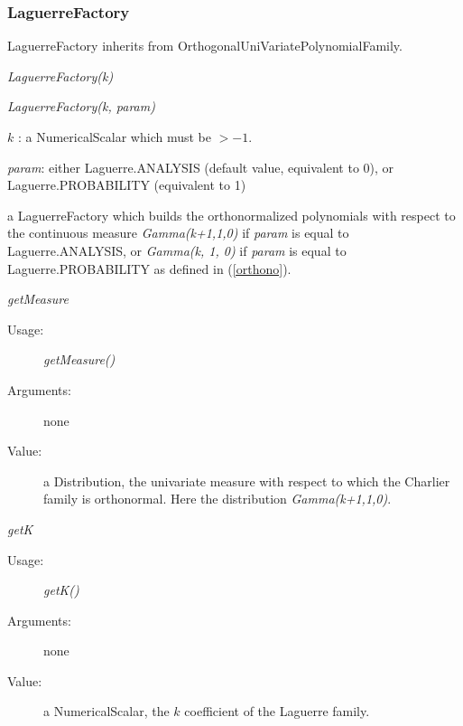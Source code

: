\newpage
\subsubsection{LaguerreFactory}

LaguerreFactory inherits from OrthogonalUniVariatePolynomialFamily.

\begin{description}
\item[Usage:]
\begin{description}
\item \textit{LaguerreFactory(k)}
\item \textit{LaguerreFactory(k, param)}
\end{description}

\item[Arguments:]
\begin{description}
\item $k$ : a NumericalScalar which must be $> -1$.
\item \textit{param}: either Laguerre.ANALYSIS (default value, equivalent to 0), or Laguerre.PROBABILITY (equivalent to 1)
\end{description}

\item[Value:]  a LaguerreFactory  which builds the orthonormalized polynomials with respect to the continuous measure \textit{Gamma(k+1,1,0)} if \textit{param} is equal to Laguerre.ANALYSIS, or \textit{Gamma(k, 1, 0)} if \textit{param} is equal to Laguerre.PROBABILITY as defined in (\ref{orthono}).

\item[Some methods :]  \rule{0pt}{1em}

\begin{description}
\item \textit{getMeasure}
\begin{description}
\item[Usage:] \textit{getMeasure()}
\item[Arguments:] none
\item[Value:]  a Distribution, the univariate measure with respect to which the Charlier family is orthonormal. Here the  distribution \textit{Gamma(k+1,1,0)}.
\end{description}
\bigskip

\item \textit{getK}
\begin{description}
\item[Usage:] \textit{getK()}
\item[Arguments:] none
\item[Value:]  a NumericalScalar, the $k$ coefficient of the Laguerre family.
\end{description}

\end{description}
\end{description}

